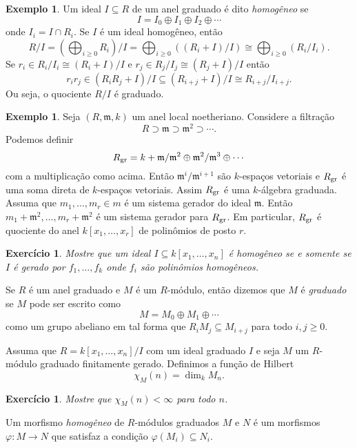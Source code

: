 \documentclass[12pt]{amsart}
\newcommand{\m}{\mathfrak m}
\newtheorem{exercise}[theorem]{Exercício}
\theoremstyle{definition}
\newtheorem{example}[theorem]{Exemplo}
\begin{document}
\begin{example} 
Um ideal $I\subseteq R$ de um anel graduado é dito \emph{homogêneo} se 
$$
I=I_0\oplus I_1\oplus I_2\oplus \cdots 
$$
onde $I_i=I\cap R_i$. Se $I$ é um ideal homogêneo, então 
$$
    R/I=\left(\bigoplus_{i\geq 0} R_i\right)/I=\bigoplus_{i\geq 0}((R_i+I)/I)\cong \bigoplus_{i\geq 0} (R_i/I_i).
$$
Se $r_i\in R_i/I_i\cong (R_i+I)/I$ e $r_j\in R_j/I_j\cong (R_j+I)/I$ então 
\[
    r_ir_j\in (R_iR_j+I)/I\subseteq (R_{i+j}+I)/I\cong R_{i+j}/I_{i+j}.
\] 
Ou seja, o quociente $R/I$ é graduado.
\end{example}

\begin{example} Seja $(R,\mathfrak m,k)$ um anel local noetheriano. Considere a filtração 
    \[
        R\supset\m\supset\m^2\supset\cdots.  
    \]
    Podemos definir
    \[
        R_{{\rm gr}}=k+\m/\m^2\oplus \m^2/\m^3\oplus \cdots
    \]
    com a multiplicação como acima.
    Então $\m^i/\m^{i+1}$ são $k$-espaços 
    vetoriais e $R_{{\rm gr}}$ é uma 
    soma direta de $k$-espaços vetoriais.
    Assim $R_{{\rm gr}}$ é uma $k$-álgebra graduada. Assuma que $m_1,\ldots,m_r\in m$ é um sistema gerador
    do ideal $\m$. Então $m_1+\m^2,\ldots,m_r+\m^2$ é um sistema gerador para $R_{{\rm gr}}$. Em particular, 
    $R_{\rm gr}$ é quociente do anel $k[x_1,\ldots,x_r]$ de polinômios de posto $r$.
\end{example}
    


\begin{exercise}
    Mostre que um ideal $I\subseteq k[x_1,\ldots,x_n]$ é homogêneo se e somente se $I$ é gerado por 
    $f_1,\ldots,f_k$ onde $f_i$ são polinômios homogêneos. 
\end{exercise}


Se $R$ é um anel graduado e $M$ é um $R$-módulo, então dizemos que $M$ é \emph{graduado} se $M$ pode ser escrito como 
$$
M=M_0\oplus M_1\oplus\cdots
$$ 
como um grupo abeliano em tal forma que $R_iM_j\subseteq M_{i+j}$ para todo $i,j\geq 0$. 


Assuma que $R=k[x_1,\ldots,x_n]/I$ com um ideal graduado $I$ e seja $M$ um $R$-módulo graduado 
finitamente gerado. Definimos a função de Hilbert  
$$
\chi_M(n)=\dim_k M_n.
$$

\begin{exercise}
    Mostre que $\chi_M(n)<\infty$ para todo $n$.
\end{exercise}



Um morfismo {\em homogêneo} de $R$-módulos graduados $M$ e $N$ é um morfismos $\varphi:M\to N$ 
que satisfaz a condição $\varphi(M_i)\subseteq N_i$. 
\end{document}

